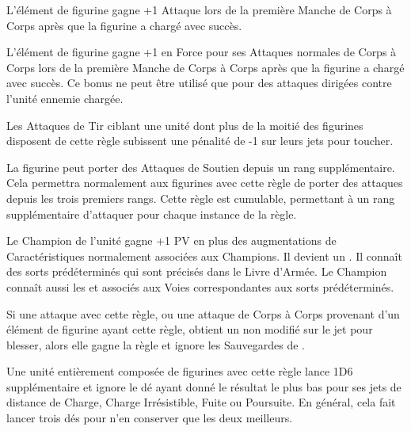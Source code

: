 L'élément de figurine gagne +1 Attaque lors de la première Manche de Corps à Corps après que la figurine a chargé avec succès.


L'élément de figurine gagne +1 en Force pour ses Attaques normales de Corps à Corps lors de la première Manche de Corps à Corps après que la figurine a chargé avec succès. Ce bonus ne peut être utilisé que pour des attaques dirigées contre l'unité ennemie chargée.


Les Attaques de Tir ciblant une unité dont plus de la moitié des figurines disposent de cette règle subissent une pénalité de -1 sur leurs jets pour toucher.


La figurine peut porter des Attaques de Soutien depuis un rang supplémentaire. Cela permettra normalement aux figurines avec cette règle de porter des attaques depuis les trois premiers rangs. Cette règle est cumulable, permettant à un rang supplémentaire d'attaquer pour chaque instance de la règle.


Le Champion de l'unité gagne +1 PV en plus des augmentations de Caractéristiques normalement associées aux Champions. Il devient un \wizardapprentice{}. Il connaît des sorts prédéterminés qui sont précisés dans le Livre d'Armée. Le Champion connaît aussi les \traitspells{} et \attributespells{} associés aux Voies correspondantes aux sorts prédéterminés.


Si une attaque avec cette règle, ou une attaque de Corps à Corps provenant d'un élément de figurine ayant cette règle, obtient un  non modifié sur le jet pour blesser, alors elle gagne la règle  et ignore les Sauvegardes de \regeneration{}.


Une unité entièrement composée de figurines avec cette règle lance 1D6 supplémentaire et ignore le dé ayant donné le résultat le plus bas pour ses jets de distance de Charge, Charge Irrésistible, Fuite ou Poursuite. En général, cela fait lancer trois dés pour n'en conserver que les deux meilleurs.


